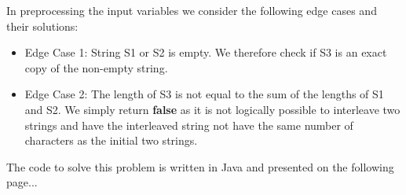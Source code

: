 \documentclass{article}
\begin{document}
In preprocessing the input variables we consider the following edge cases and their solutions:
\begin{itemize}
\item Edge Case 1: String S1 or S2 is empty. We therefore check if S3 is an exact copy of the non-empty string.
\item Edge Case 2: The length of S3 is not equal to the sum of the lengths of S1 and S2. We simply return \textbf{false} as it is not logically possible to interleave two strings and have the interleaved string not have the same number of characters as the initial two strings.
\end{itemize}

The code to solve this problem is written in Java and presented on the following page...
\newpage   

\end{document}

